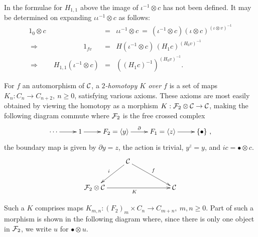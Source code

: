 \noindent
In the formulae for $H_{1,1}$ above the image of $\iota^{-1} \otimes c$ 
has not been defined.  
It may be determined on expanding $\iota\iota^{-1} \otimes c$ as follows: 
\begin{eqnarray*}
1_0 \otimes c 
  &=&  \iota\iota^{-1} \otimes c 
       ~=~ (\iota^{-1} \otimes c)(\iota \otimes c)^{(\iota \otimes v)^{-1}} \\
\Rightarrow \qquad\qquad\qquad~ 1_{fv} 
  &=&  H(\iota^{-1} \otimes c)\,(H_1c)^{(H_0v)^{-1}} \\
\Rightarrow \qquad H_{1,1}(\iota^{-1} \otimes c)
  &=&  ((H_1 c)^{-1})^{(H_0v)^{-1}} .
\end{eqnarray*}


\bigskip
For $f$ an automorphism of $\mathcal{C}$, a \emph{$2$-homotopy $K$ over $f$} 
is a set of maps $K_n : C_n \to C_{n+2},~ n \geqslant 0$, 
satisfying various axioms. 
These axioms are most easily obtained by viewing the homotopy 
as a morphism $K : \mathcal{F}_2\otimes\mathcal{C} \to \mathcal{C}$, 
making the following diagram commute 
where $\mathcal{F}_2$ is the free crossed complex 
$$
\xymatrix{ 
  \cdots \ar[r] 
    & 1 \ar[r] 
      & F_2 = \langle y \rangle \ar[r]^{\partial}  
        & F_1 = \langle z \rangle \ar[r] 
          & \{\bullet\}~, 
}
$$
the boundary map is given by $\partial y = z$, 
the action is trivial, $y^z=y$, and $ic = \bullet \otimes c$. 
$$
\xymatrix{ 
   & \calC \ar[ld]_{i} \ar[drr]^f
     & & \\
  \calF_2\otimes\calC \ar[rrr]_{K}  
   & & & \calC 
}
$$

\newpage
Such a $K$ comprises maps 
$K_{m,n} : (F_2)_m \times C_n \to C_{m+n},~ m,n \geqslant 0$.  
Part of such a morphism is shown in the following diagram where, 
since there is only one object in $\mathcal{F}_2$, 
we write $u$ for $\bullet \otimes u$. 

\bigskip \bigskip
\begin{figure}[htbp]
\begin{center}

\label{figure:xcom-2hom}
\end{center}
\end{figure}

